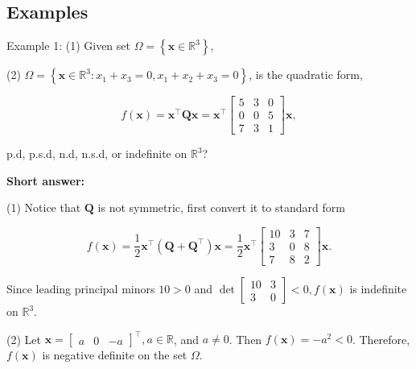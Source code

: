 \subsection{Examples}
Example 1: (1) Given set \(\Omega=\left\{\boldsymbol{x} \in \mathbb{R}^{3}\right\}\),

(2) \(\Omega=\left\{\boldsymbol{x} \in \mathbb{R}^{3}: x_{1}+x_{3}=0, x_{1}+x_{2}+x_{3}=0\right\}\), is the quadratic form,

\begin{equation*}
	f(\boldsymbol{x})=\boldsymbol{x}^{\top} \boldsymbol{Q} \boldsymbol{x}=\boldsymbol{x}^{\top}\left[\begin{array}{ccc}
		5 & 3 & 0 \\
		0 & 0 & 5 \\
		7 & 3 & 1
	\end{array}\right] \boldsymbol{x},
\end{equation*}

p.d, p.s.d, n.d, n.s.d, or indefinite on \(\mathbb{R}^{3}\)?

\noindent
\textbf{Short answer:}

(1) Notice that \(\boldsymbol{Q}\) is not symmetric, first convert it to standard form

\begin{equation*}
	f(\boldsymbol{x})=\frac{1}{2} \boldsymbol{x}^{\top}\left(\boldsymbol{Q}+\boldsymbol{Q}^{\top}\right) \boldsymbol{x}=\frac{1}{2} \boldsymbol{x}^{\top}\left[\begin{array}{ccc}
		10 & 3 & 7 \\
		3 & 0 & 8 \\
		7 & 8 & 2
	\end{array}\right] \boldsymbol{x} .
\end{equation*}

Since leading principal minors \(10>0\) and \(\operatorname{det}\left[\begin{array}{cc}10 & 3 \\ 3 & 0\end{array}\right]<0, f(\boldsymbol{x})\) is indefinite on \(\mathbb{R}^{3}\).


(2) Let \(\boldsymbol{x}=\left[\begin{array}{lll}a & 0 & -a\end{array}\right]^{\top}, a \in \mathbb{R}\), and \(a \neq 0\). Then \(f(\boldsymbol{x})=-a^{2}<0\). Therefore, \(f(\boldsymbol{x})\) is negative definite on the set \(\Omega\).


